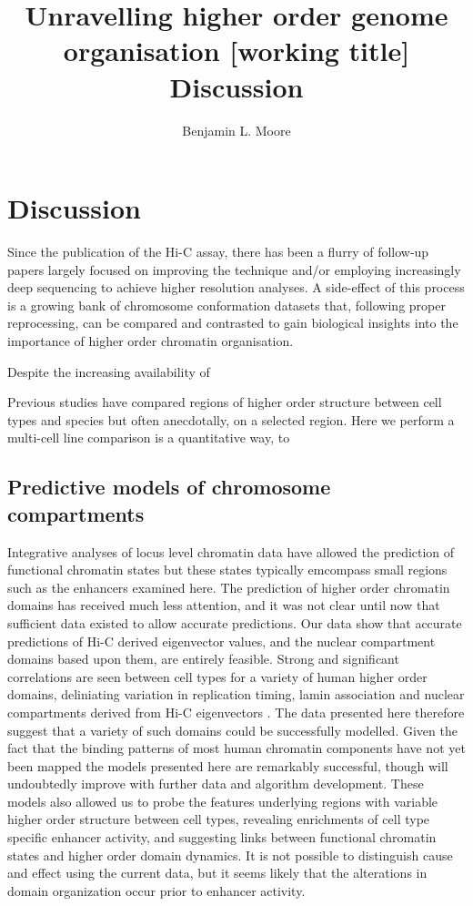\documentclass[a4paper,10pt,oneside]{book}
\title{ \vspace{3in} Unravelling higher order genome organisation {\small [working
    title]} \\ \vspace{2em} {\large {\bf Discussion}} }
\author{Benjamin L. Moore}
\begin{document}

\chapter{Discussion}

Since the publication of the Hi-C assay, there has been a flurry of follow-up papers largely focused on improving the technique and/or employing increasingly deep sequencing to achieve higher resolution analyses. A side-effect of this process is a growing bank of chromosome conformation datasets that, following proper reprocessing, can be compared and contrasted to gain biological insights into the importance of higher order chromatin organisation.

Despite the increasing availability of 

Previous studies have compared regions of higher order structure between cell types\cite{Lieberman2009} and species\cite{Dixon2012} but often anecdotally, on a selected region. Here we perform a multi-cell line comparison is a quantitative way, to 


\section{Predictive models of chromosome compartments}

Integrative analyses of locus level chromatin data have allowed the
prediction of functional chromatin states \cite{Ernst2012, Ram2011,
  Dunham2012, Hoffman2013} but these states typically emcompass small
regions such as the enhancers examined here. The prediction of higher
order chromatin domains has received much less attention, and it was
not clear until now that sufficient data existed to allow accurate
predictions. Our data show that accurate predictions of Hi-C derived
eigenvector values, and the nuclear compartment domains based upon
them, are entirely feasible. Strong and significant correlations are
seen between cell types for a variety of human higher order domains,
deliniating variation in replication timing, lamin association and
nuclear compartments derived from Hi-C eigenvectors
\cite{Chambers2013}. The data presented here therefore suggest that a
variety of such domains could be successfully modelled. Given the fact
that the binding patterns of most human chromatin components have not
yet been mapped the models presented here are remarkably successful,
though will undoubtedly improve with further data and algorithm
development. These models also allowed us to probe the features
underlying regions with variable higher order structure between cell
types, revealing enrichments of cell type specific enhancer activity,
and suggesting links between functional chromatin states and higher
order domain dynamics. It is not possible to distinguish cause and
effect using the current data, but it seems likely that the
alterations in domain organization occur prior to enhancer activity.
\end{document}
